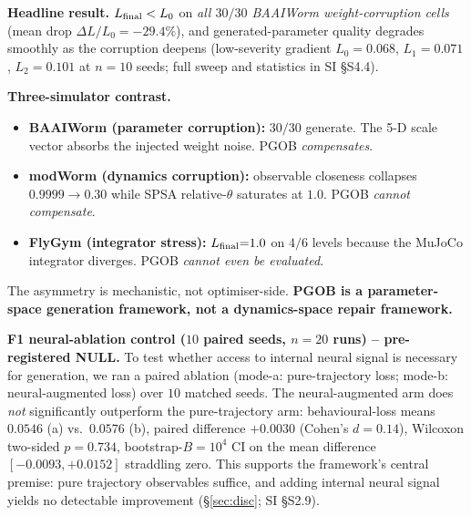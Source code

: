 \documentclass[11pt]{article}
\begin{document}
\textbf{Headline result.} $L_{\rm final}<L_0$ on \emph{all $30/30$ BAAIWorm weight-corruption cells} (mean drop $\Delta L/L_0{=}-29.4\%$), and generated-parameter quality degrades smoothly as the corruption deepens (low-severity gradient $L_0{=}0.068$, $L_1{=}0.071$, $L_2{=}0.101$ at $n{=}10$ seeds; full sweep and statistics in SI \S S4.4).

\textbf{Three-simulator contrast.}
\begin{itemize}\itemsep0pt
\item \textbf{BAAIWorm (parameter corruption):} $30/30$ generate. The 5-D scale vector absorbs the injected weight noise. PGOB \emph{compensates}.
\item \textbf{modWorm (dynamics corruption):} observable closeness collapses $0.9999\to 0.30$ while SPSA relative-$\theta$ saturates at $1.0$. PGOB \emph{cannot compensate}.
\item \textbf{FlyGym (integrator stress):} $L_{\rm final}{=}1.0$ on $4/6$ levels because the MuJoCo integrator diverges. PGOB \emph{cannot even be evaluated}.
\end{itemize}
The asymmetry is mechanistic, not optimiser-side. \textbf{PGOB is a parameter-space generation framework, not a dynamics-space repair framework.}

\textbf{F1 neural-ablation control ($10$ paired seeds, $n{=}20$ runs) -- pre-registered NULL.} To test whether access to internal neural signal is necessary for generation, we ran a paired ablation (mode-a: pure-trajectory loss; mode-b: neural-augmented loss) over $10$ matched seeds. The neural-augmented arm does \emph{not} significantly outperform the pure-trajectory arm: behavioural-loss means $0.0546$ (a) vs.\ $0.0576$ (b), paired difference $+0.0030$ (Cohen's $d{=}0.14$), Wilcoxon two-sided $p{=}0.734$, bootstrap-$B{=}10^4$ CI on the mean difference $[-0.0093,+0.0152]$ straddling zero. This supports the framework's central premise: pure trajectory observables suffice, and adding internal neural signal yields no detectable improvement (\S\ref{sec:disc}; SI \S S2.9).
\end{document}
